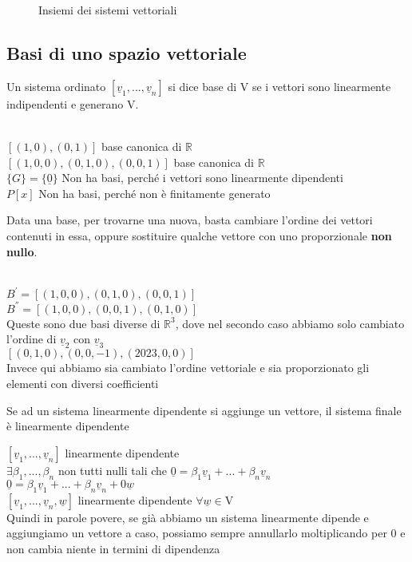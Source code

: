 \begin{figure}[H]
	\centering
	\caption[Caption]{Insiemi dei sistemi vettoriali}
	\label{fig:insiemisistemivett}
\end{figure}

\subsection{Basi di uno spazio vettoriale}

Un sistema ordinato $[\underline{v}_1,...,\underline{v}_n]$ si dice base di V se i vettori sono linearmente indipendenti e generano V.
\begin{nota}
	\phantom{}\\
	$[(1,0),(0,1)]$ base canonica di $\mathbb{R}$\\
	$[(1,0,0),(0,1,0),(0,0,1)]$ base canonica di $\mathbb{R}$\\
	$\{G\}=\{\underline{0}\}$ Non ha basi, perché i vettori sono linearmente dipendenti\\
	$P[x]$ Non ha basi, perché non è finitamente generato
\end{nota}

Data una base, per trovarne una nuova, basta cambiare l'ordine dei vettori contenuti in essa, oppure sostituire qualche vettore con uno proporzionale \textbf{non nullo}.

\begin{es}
	\phantom{}\\
	$B^{'}=[(1,0,0),(0,1,0),(0,0,1)]$\\
	$B^{''}=[(1,0,0),(0,0,1),(0,1,0)]$\\
	Queste sono due basi diverse di $\mathbb{R}^3$, dove nel secondo caso abbiamo solo cambiato l'ordine di $\underline{v}_2$ con $\underline{v}_3$\\
	$[(0,1,0),(0,0,-1),(2023,0,0)]$\\
	Invece qui abbiamo sia cambiato l'ordine vettoriale e sia proporzionato gli elementi con diversi coefficienti
\end{es}

\begin{nota}[DIP+1=DIP]
	Se ad un sistema linearmente dipendente si aggiunge un vettore, il sistema finale è linearmente dipendente
	\begin{dimostrazione}
		$[\underline{v}_1,...,\underline{v}_n]$ linearmente dipendente\\
		$\exists\beta_1,...,\beta_n$ non tutti nulli tali che $\underline{0}=\beta_1\underline{v}_1+...+\beta_n\underline{v}_n$\\
		$\underline{0}=\beta_1\underline{v}_1+...+\beta_n\underline{v}_n+0\underline{w}$\\
		$[\underline{v}_1,...,\underline{v}_n,\underline{w}]$ linearmente dipendente $\forall\underline{w}\in$V\\
		Quindi in parole povere, se già abbiamo un sistema linearmente dipende e aggiungiamo un vettore a caso, possiamo sempre annullarlo moltiplicando per 0 e non cambia niente in termini di dipendenza
	\end{dimostrazione}
\end{nota}

